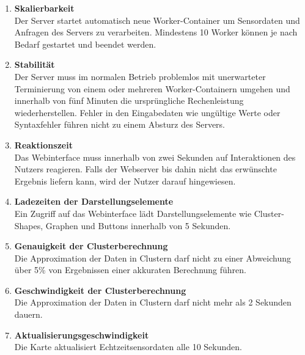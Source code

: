 \begin{enumerate}[label=\textbf{NF\arabic{enumi}0}]
	\item \textbf{Skalierbarkeit}\\
	Der Server startet automatisch neue Worker-Container um Sensordaten und Anfragen des Servers zu verarbeiten. Mindestens 10 Worker können je nach Bedarf gestartet und beendet werden.
	
	\item \textbf{Stabilität}\\  
	Der Server muss im normalen Betrieb problemlos mit unerwarteter Terminierung von einem oder mehreren Worker-Containern umgehen und innerhalb von fünf Minuten die ursprüngliche Rechenleistung wiederherstellen. Fehler in den Eingabedaten wie ungültige Werte oder Syntaxfehler führen nicht zu einem Absturz des Servers.
	
	\item \textbf{Reaktionszeit}\\
	Das Webinterface muss innerhalb von zwei Sekunden auf Interaktionen des Nutzers reagieren. Falls der Webserver bis dahin nicht das erwünschte Ergebnis liefern kann, wird der Nutzer darauf hingewiesen.
	
	\item \textbf{Ladezeiten der Darstellungselemente}\\
	Ein Zugriff auf das Webinterface lädt Darstellungselemente wie Cluster-Shapes, Graphen und Buttons innerhalb von 5 Sekunden.
	
	\item \textbf{Genauigkeit der Clusterberechnung}\\
	Die Approximation der Daten in Clustern darf nicht zu einer Abweichung über 5\% von Ergebnissen einer akkuraten Berechnung führen.
	
	\item \textbf{Geschwindigkeit der Clusterberechnung}\\
	Die Approximation der Daten in Clustern darf nicht mehr als 2 Sekunden dauern.
	
	\item \textbf{Aktualisierungsgeschwindigkeit}\\
	Die Karte aktualisiert Echtzeitsensordaten alle 10 Sekunden.

\end{enumerate}
	